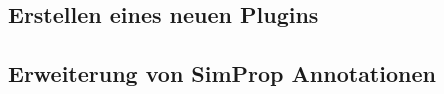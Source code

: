 \documentclass[a4paper, 11pt]{article} %
\begin{document}
\subsection{Erstellen eines neuen Plugins} %
\label{sub:neues_plugin}

\subsection{Erweiterung von SimProp Annotationen} %
\label{sub:erweiterung_von_simulation_property_annotationen}







\end{document}
